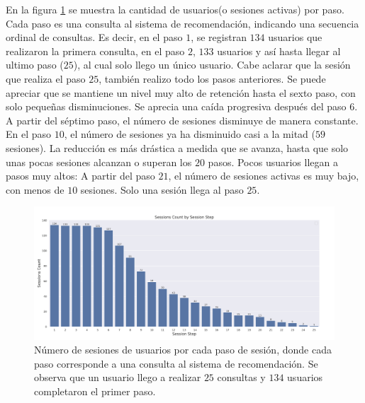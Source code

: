 \documentclass[11pt,a4paper,twoside]{thesis}
\begin{document}
En la figura \ref{fig:llama2-sessions_count_by_session_step} se muestra la cantidad de usuarios(o sesiones activas) por paso. Cada paso es una consulta al sistema de recomendación, indicando una secuencia ordinal de consultas. Es decir, en el paso $1$, se registran $134$ usuarios que realizaron la primera consulta, en el paso $2$, $133$ usuarios y así hasta llegar al ultimo paso ($25$), al cual solo llego un único usuario. Cabe aclarar que la sesión que realiza el paso $25$, también realizo todo los pasos anteriores. Se puede apreciar que se mantiene un nivel muy alto de retención hasta el sexto paso, con solo pequeñas disminuciones.
Se aprecia una caída progresiva después del paso $6$. A partir del séptimo paso, el número de sesiones disminuye de manera constante. En el paso $10$, el número de sesiones ya ha disminuido casi a la mitad ($59$ sesiones). La reducción es más drástica a medida que se avanza, hasta que solo unas pocas sesiones alcanzan o superan los $20$ pasos.
Pocos usuarios llegan a pasos muy altos: A partir del paso $21$, el número de sesiones activas es muy bajo, con menos de $10$ sesiones. Solo una sesión llega al paso $25$.

\begin{figure}[H]
	\centering
	\includegraphics[width=15cm]{./images/llama2/sessions_count_by_session_step.png}
	\caption{Número de sesiones de usuarios por  cada paso de sesión, donde cada paso corresponde a una consulta al sistema de recomendación. Se observa que un usuario llego a realizar $25$ consultas y $134$ usuarios completaron el primer paso.}
	\label{fig:llama2-sessions_count_by_session_step}
\end{figure}
\end{document}
